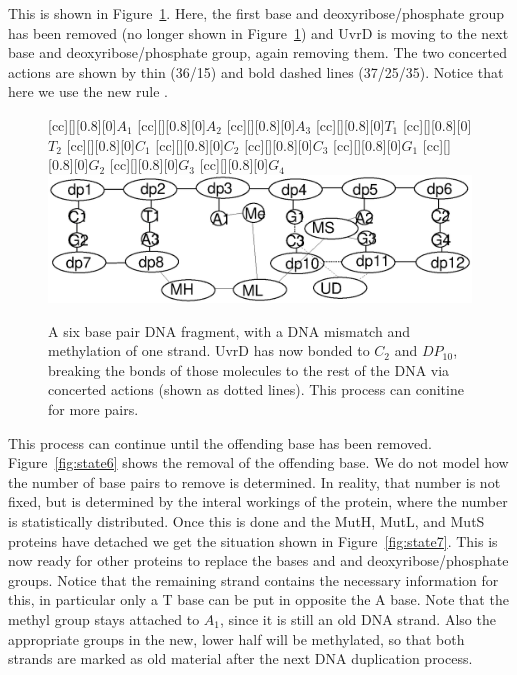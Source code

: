 This is shown in Figure~\ref{fig:state4}. Here, the first  base and deoxyribose/phosphate group has been removed (no longer shown in Figure~\ref{fig:state4}) and UvrD is moving to the next  base and deoxyribose/phosphate group, again removing them. The two concerted actions are shown by thin (36/15) and bold dashed lines (37/25/35). Notice that here we use the new rule .

\begin{figure}[h!]
[cc][][0.8][0]{${A_1}$}
[cc][][0.8][0]{${A_2}$}
[cc][][0.8][0]{${A_3}$}
[cc][][0.8][0]{${T_1}$}
[cc][][0.8][0]{${T_2}$}
[cc][][0.8][0]{${C_1}$}
[cc][][0.8][0]{${C_2}$}
[cc][][0.8][0]{${C_3}$}
[cc][][0.8][0]{${G_1}$}
[cc][][0.8][0]{${G_2}$}
[cc][][0.8][0]{${G_3}$}
[cc][][0.8][0]{${G_4}$}
  \centering
    \includegraphics[width=1.0\textwidth]{mmr/state4}
  \caption[A six base pair DNA fragment.]{A six base pair DNA fragment, with a DNA mismatch and methylation of one strand. UvrD has now bonded to $C_2$ and $DP_{10}$, breaking the bonds of those molecules to the rest of the DNA via concerted actions (shown as dotted lines). This process can conitine for more pairs.}
  \label{fig:state4}
\end{figure}

This process can continue until the offending base has been removed. Figure~\ref{fig:state6} shows the removal of the offending base. We do not model how the number of base pairs to remove is determined. In reality, that number is not fixed, but is determined by the interal workings of the protein, where the number is statistically distributed. Once this is done and the MutH, MutL, and MutS proteins have detached we get the situation shown in Figure~\ref{fig:state7}. This is now ready for other proteins to replace the bases and and deoxyribose/phosphate groups. Notice that the remaining strand contains the necessary information for this, in particular only a T base can be put in opposite the A base. Note that the methyl group stays attached to $A_1$, since it is still an old DNA strand. Also the appropriate groups in the new, lower half will be methylated, so that both strands are marked as old material after the next DNA duplication process.

